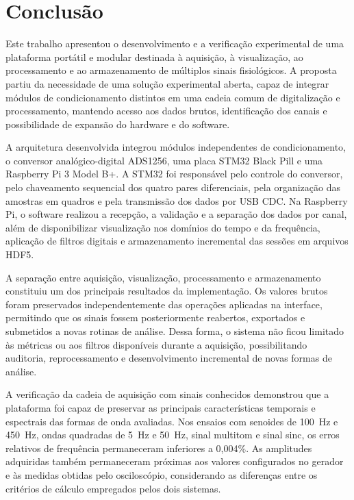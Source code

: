 \documentclass[a4paper,12pt]{fcte}
\begin{document}
\chapter{Conclusão}
\label{cap:conclusao}

Este trabalho apresentou o desenvolvimento e a verificação experimental de uma plataforma portátil e modular destinada à aquisição, à visualização, ao processamento e ao armazenamento de múltiplos sinais fisiológicos. A proposta partiu da necessidade de uma solução experimental aberta, capaz de integrar módulos de condicionamento distintos em uma cadeia comum de digitalização e processamento, mantendo acesso aos dados brutos, identificação dos canais e possibilidade de expansão do hardware e do software.

A arquitetura desenvolvida integrou módulos independentes de condicionamento, o conversor analógico-digital ADS1256, uma placa STM32 Black Pill e uma Raspberry Pi 3 Model B+. A STM32 foi responsável pelo controle do conversor, pelo chaveamento sequencial dos quatro pares diferenciais, pela organização das amostras em quadros e pela transmissão dos dados por USB CDC. Na Raspberry Pi, o software realizou a recepção, a validação e a separação dos dados por canal, além de disponibilizar visualização nos domínios do tempo e da frequência, aplicação de filtros digitais e armazenamento incremental das sessões em arquivos HDF5.

A separação entre aquisição, visualização, processamento e armazenamento constituiu um dos principais resultados da implementação. Os valores brutos foram preservados independentemente das operações aplicadas na interface, permitindo que os sinais fossem posteriormente reabertos, exportados e submetidos a novas rotinas de análise. Dessa forma, o sistema não ficou limitado às métricas ou aos filtros disponíveis durante a aquisição, possibilitando auditoria, reprocessamento e desenvolvimento incremental de novas formas de análise.

A verificação da cadeia de aquisição com sinais conhecidos demonstrou que a plataforma foi capaz de preservar as principais características temporais e espectrais das formas de onda avaliadas. Nos ensaios com senoides de 100~Hz e 450~Hz, ondas quadradas de 5~Hz e 50~Hz, sinal multitom e sinal sinc, os erros relativos de frequência permaneceram inferiores a 0,004\%. As amplitudes adquiridas também permaneceram próximas aos valores configurados no gerador e às medidas obtidas pelo osciloscópio, considerando as diferenças entre os critérios de cálculo empregados pelos dois sistemas.
\end{document}
